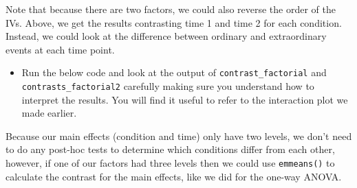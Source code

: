 \documentclass[]{book}
\newenvironment{Shaded}{\begin{snugshade}}{\end{snugshade}}
\newcommand{\CommentTok}[1]{\textcolor[rgb]{0.56,0.35,0.01}{\textit{#1}}}
\newcommand{\DataTypeTok}[1]{\textcolor[rgb]{0.13,0.29,0.53}{#1}}
\newcommand{\KeywordTok}[1]{\textcolor[rgb]{0.13,0.29,0.53}{\textbf{#1}}}
\newcommand{\NormalTok}[1]{#1}
\newcommand{\OperatorTok}[1]{\textcolor[rgb]{0.81,0.36,0.00}{\textbf{#1}}}
\newcommand{\StringTok}[1]{\textcolor[rgb]{0.31,0.60,0.02}{#1}}
\providecommand{\tightlist}{%
  \setlength{\itemsep}{0pt}\setlength{\parskip}{0pt}}
\begin{document}
\begin{Shaded}
\end{Shaded}

Note that because there are two factors, we could also reverse the order of the IVs. Above, we get the results contrasting time 1 and time 2 for each condition. Instead, we could look at the difference between ordinary and extraordinary events at each time point.

\begin{itemize}
\tightlist
\item
  Run the below code and look at the output of \texttt{contrast\_factorial} and \texttt{contrasts\_factorial2} carefully making sure you understand how to interpret the results. You will find it useful to refer to the interaction plot we made earlier.
\end{itemize}

\begin{Shaded}
\end{Shaded}

Because our main effects (condition and time) only have two levels, we don't need to do any post-hoc tests to determine which conditions differ from each other, however, if one of our factors had three levels then we could use \texttt{emmeans()} to calculate the contrast for the main effects, like we did for the one-way ANOVA.
\end{document}
